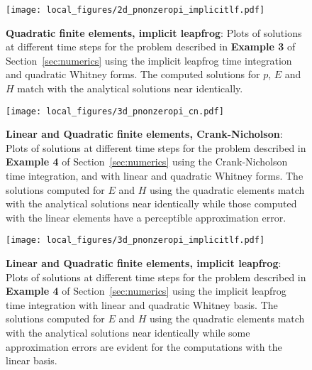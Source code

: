 \documentclass{amsart}
\theoremstyle{thmstyleone}%
\theoremstyle{thmstyletwo}%
\theoremstyle{thmstylethree}%
\begin{document}
\vspace{\fill}
\begin{figure}[h]
  \centering
  \texttt{[image: local\_figures/2d\_pnonzeropi\_implicitlf.pdf]}
  \caption{\textbf{Quadratic finite elements, implicit leapfrog}: Plots of solutions at different time steps for the problem described in \textbf{Example 3} of Section~\ref{sec:numerics} using the implicit leapfrog time integration and quadratic Whitney forms. The computed solutions for $p$, $E$ and $H$ match with the analytical solutions near identically.}
  \label{fig:example3_lf}
\end{figure}
\vspace{\fill}
\clearpage

\vspace{\fill}
\begin{figure}[h]
  \centering
  \texttt{[image: local\_figures/3d\_pnonzeropi\_cn.pdf]}
  \caption{\textbf{Linear and Quadratic finite elements, Crank-Nicholson}: Plots of solutions at different time steps for the problem described in \textbf{Example 4} of Section~\ref{sec:numerics} using the Crank-Nicholson time integration, and with linear and quadratic Whitney forms. The solutions computed for $E$ and $H$ using the quadratic elements match with the analytical solutions near identically while those computed with the linear elements have a perceptible approximation error.}
  \label{fig:example4_cn}
\end{figure}
\vspace{\fill}
\clearpage

\vspace{\fill}
\begin{figure}[h]
  \centering
  \texttt{[image: local\_figures/3d\_pnonzeropi\_implicitlf.pdf]}
  \caption{\textbf{Linear and Quadratic finite elements, implicit leapfrog}: Plots of solutions at different time steps for the problem described in \textbf{Example 4} of Section~\ref{sec:numerics} using the implicit leapfrog time integration with linear and quadratic Whitney basis. The solutions computed for $E$ and $H$ using the quadratic elements match with the analytical solutions near identically while some approximation errors are evident for the computations with the linear basis.}
  \label{fig:example4_lf}
\end{figure}
\vspace{\fill}
\clearpage
\end{document}
